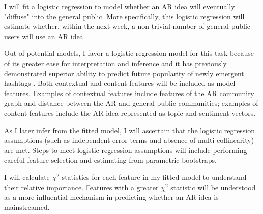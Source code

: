 \documentclass[acmlarge, screen, authorversion]{acmart}
\begin{document}
I will fit a logistic regression to model whether an AR idea will eventually "diffuse" into the general public. More specifically, this
logistic regression will estimate whether, within the next week, a
non-trivial number of general public users will use an AR idea.

Out of potential models, I favor a logistic regression model for this task
because of its greater ease for interpretation and inference and it has
previously demonstrated superior ability to predict future popularity of newly
emergent hashtags \cite{maPredictingPopularityNewly2013}. Both contextual and
content features will be included as model features. Examples of contextual
features include features of the AR community graph and distance between the AR
and general public communities; examples of content features include the AR idea
represented as topic and sentiment vectors.

As I later infer from the fitted model, I will ascertain that the logistic
regression assumptions (such as independent error terms and absence of
multi-collinearity) are met. Steps to meet logistic regression assumptions will
include performing careful feature selection and estimating from parametric
bootstraps.

I will calculate $\chi^2$ statistics for each feature in my fitted model to
understand their relative importance. Features with a greater $\chi^2$ statistic
will be understood as a more influential mechanism in predicting whether an AR
idea is mainstreamed.
\end{document}
